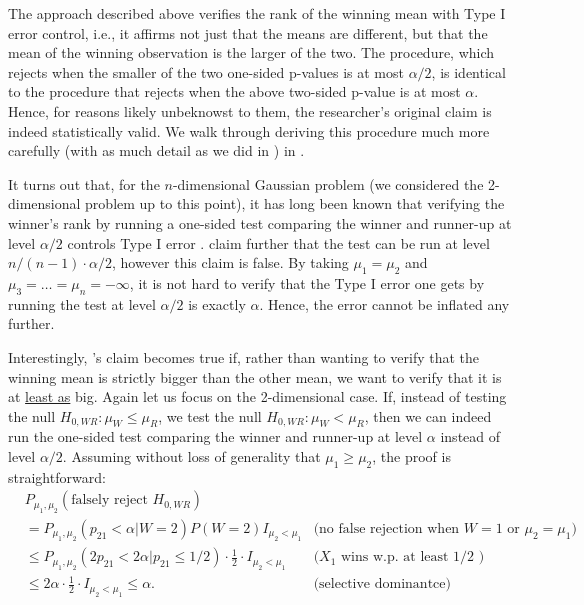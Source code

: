 \documentclass{article}
\begin{document}
The approach described above verifies the rank of the winning mean with Type I error control, i.e., it affirms not just that the means are different, but that the mean of the winning observation is the larger of the two. The procedure, which rejects when the smaller of the two one-sided p-values is at most $\alpha/2$, is identical to the procedure that rejects when the above two-sided p-value is at most $\alpha$. Hence, for reasons likely unbeknowst to them, the researcher's original claim is indeed statistically valid. We walk through deriving this procedure much more carefully (with as much detail as we did in ) in .

It turns out that, for the $n$-dimensional Gaussian problem (we considered the 2-dimensional problem up to this point), it has long been known that verifying the winner's rank by running a one-sided test comparing the winner and runner-up at level $\alpha/2$ controls Type I error \citep{Gutmann}. \cite{Hung2019} claim further that the test can be run at level $n/(n-1) \cdot \alpha/2$, however this claim is false. By taking $\mu_1 = \mu_2$ and $\mu_3 = \dots = \mu_n = -\infty$, it is not hard to verify that the Type I error one gets by running the test at level $\alpha/2$ is exactly $\alpha$. Hence, the error cannot be inflated any further.  

Interestingly, \cite{Hung2019}'s claim becomes true if, rather than wanting to verify that the winning mean is strictly bigger than the other mean, we want to verify that it is at \underline{least as} big. Again let us focus on the 2-dimensional case. If, instead of testing the null $H_{0, WR}: \mu_W \leq \mu_R$, we test the null $H_{0, WR} :\mu_W < \mu_R$, then we can indeed run the one-sided test comparing the winner and runner-up at level $\alpha$ instead of level $\alpha/2$. Assuming without loss of generality that $\mu_1 \geq \mu_2$, the proof is straightforward:
\begin{align*}
    &P_{\mu_1, \mu_2}(\text{falsely reject } H_{0, WR}) &\\
    & =P_{\mu_1, \mu_2}(p_{21} < \alpha | W = 2)P(W=2)I_{\mu_2 < \mu_1} & \text{(no false rejection when $W=1$ or $\mu_2 =\mu_1$)}\\
    &\leq P_{\mu_1, \mu_2}(2p_{21} < 2\alpha | p_{21} \leq 1/2)\cdot \frac{1}{2} \cdot I_{\mu_2 < \mu_1} & \text{($X_1$ wins w.p. at least $1/2$ )}\\
    &\leq 2 \alpha \cdot \frac{1}{2} \cdot I_{\mu_2 < \mu_1} \leq \alpha. & \text{(selective dominantce)}
\end{align*}
\end{document}
